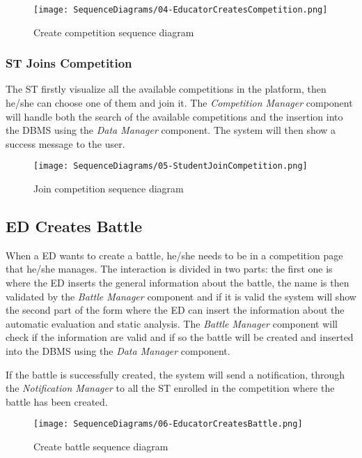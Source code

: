 \begin{figure}[H]
  \centering
  \texttt{[image: SequenceDiagrams/04-EducatorCreatesCompetition.png]}
  \caption{Create competition sequence diagram}
  \label{fig:create_competition_diagramn}
\end{figure}

\subsubsection*{ST Joins Competition}
\label{ss:join_competition_diagram}
The ST firstly visualize all the available competitions in the platform, then he/she can choose one of them and join it. The \textit{Competition Manager} component will handle both the search of the available competitions and the insertion into the DBMS using the \textit{Data Manager} component. The system will then show a success message to the user.

\begin{figure}[H]
  \centering
  \texttt{[image: SequenceDiagrams/05-StudentJoinCompetition.png]}
  \caption{Join competition sequence diagram}
  \label{fig:join_competition_diagramn}
\end{figure}

\subsection*{ED Creates Battle}
\label{ss:create_battle_diagram}
When a ED wants to create a battle, he/she needs to be in a competition page that he/she manages. The interaction is divided in two parts: the first one is where the ED inserts the general information about the battle, the name is then validated by the \textit{Battle Manager} component and if it is valid the system will show the second part of the form where the ED can insert the information about the automatic evaluation and static analysis. The \textit{Battle Manager} component will check if the information are valid and if so the battle will be created and inserted into the DBMS using the \textit{Data Manager} component.

If the battle is successfully created, the system will send a notification, through the \textit{Notification Manager} to all the ST enrolled in the competition where the battle has been created.

\begin{figure}[H]
  \centering
  \texttt{[image: SequenceDiagrams/06-EducatorCreatesBattle.png]}
  \caption{Create battle sequence diagram}
  \label{fig:create_battle_diagramn}
\end{figure}

